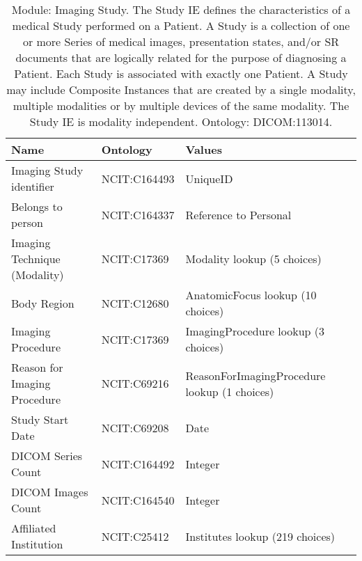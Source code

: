 \documentclass{article}
\begin{document}
\begin{table}[htb]
\begin{tabular}{lll}
Name & Ontology & Values \\
\hline
Imaging Study identifier & NCIT:C164493 & UniqueID \\
Belongs to person & NCIT:C164337 & Reference to Personal \\
Imaging Technique (Modality) & NCIT:C17369 & Modality lookup (5 choices) \\
Body Region & NCIT:C12680 & AnatomicFocus lookup (10 choices) \\
Imaging Procedure & NCIT:C17369 & ImagingProcedure lookup (3 choices) \\
Reason for Imaging Procedure & NCIT:C69216 & ReasonForImagingProcedure lookup (1 choices) \\
Study Start Date & NCIT:C69208 & Date \\
DICOM Series Count & NCIT:C164492 & Integer \\
DICOM Images Count & NCIT:C164540 & Integer \\
Affiliated Institution & NCIT:C25412 & Institutes lookup (219 choices) \\
\hline
\end{tabular}
\caption[Module: Imaging Study]{\label{table:table15} Module: Imaging Study. The Study IE defines the characteristics of a medical Study performed on a Patient. A Study is a collection of one or more Series of medical images, presentation states, and/or SR documents that are logically related for the purpose of diagnosing a Patient. Each Study is associated with exactly one Patient. A Study may include Composite Instances that are created by a single modality, multiple modalities or by multiple devices of the same modality. The Study IE is modality independent. Ontology: DICOM:113014. }
\end{table}
\end{document}
